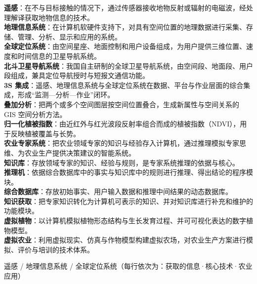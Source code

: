 \documentclass[a4paper,11pt]{article}
\begin{document}
\begin{keyterms}
\textbf{遥感}：在不与目标接触的情况下，通过传感器接收地物反射或辐射的电磁波，经处理解译获取地物信息的技术。\\
\textbf{地理信息系统}：在计算机软硬件支持下，对具有空间位置的地理数据进行采集、存储、管理、分析、显示和应用的系统。\\
\textbf{全球定位系统}：由空间星座、地面控制和用户设备组成，为用户提供三维位置、速度和时间信息的卫星导航系统。\\
\textbf{北斗卫星导航系统}：我国自主研制的全球卫星导航系统，由空间段、地面段、用户段组成，兼具定位导航授时与短报文通信功能。\\
\textbf{3S 集成}：遥感、地理信息系统与全球定位系统在数据、平台与作业层面的综合集成，形成“监测—分析—作业”闭环。\\
\textbf{叠加分析}：把两个或多个空间图层按空间位置叠合，生成新属性与空间关系的 GIS 空间分析方法。\\
\textbf{归一化植被指数}：由近红外与红光波段反射率组合而成的植被指数（NDVI），用于反映植被覆盖与长势。\\
\textbf{农业专家系统}：把农业领域专家的知识与经验存入计算机，通过推理模拟专家思维、为农业生产提供决策建议的智能系统。\\
\textbf{知识库}：存放领域专家的知识、经验与规则，是专家系统推理的依据与核心。\\
\textbf{推理机}：依据综合数据库中的事实与知识库中的规则进行推理、得出结论的程序模块。\\
\textbf{综合数据库}：存放初始事实、用户输入数据和推理中间结果的动态数据库。\\
\textbf{知识获取}：把专家知识转化为计算机可表示的知识、并对知识库进行补充和维护的功能模块。\\
\textbf{虚拟植物}：以计算机模拟植物形态结构与生长发育过程、并可可视化表达的数字植物模型。\\
\textbf{虚拟农业}：利用虚拟现实、仿真与作物模型构建虚拟农场，对农业生产方案进行模拟、评价与培训的技术体系。
\end{keyterms}

\newpage
\begin{contrast}{遥感 / 地理信息系统 / 全球定位系统（每行依次为：获取的信息·核心技术·农业应用）}
\end{contrast}
\end{document}
